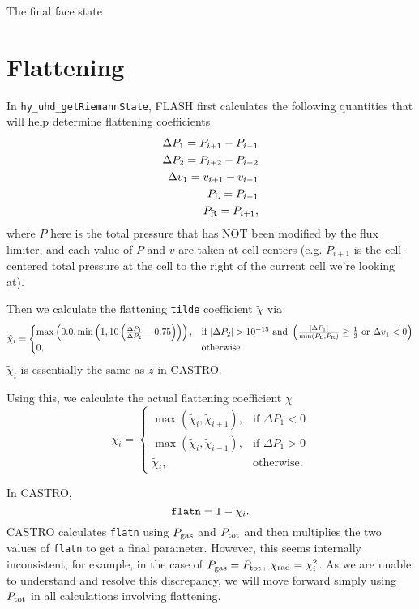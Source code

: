 \documentclass[preprint,11pt]{aastex}
\newcommand{\beq}{\begin{equation}}
\newcommand{\eeq}{\end{equation}}
\newcommand{\bea}{\begin{eqnarray}}
\newcommand{\eea}{\end{eqnarray}}
\begin{document}
The final face state 

\section{Flattening}
\label{sec:flattening}
In \verb!hy_uhd_getRiemannState!, FLASH first calculates the following quantities that will help determine flattening coefficients
\bea
\Delta P_1 = P_{i+1} - P_{i-1} \\
\Delta P_2 = P_{i+2} - P_{i-2} \\
\Delta v_1 = v_{i+1} - v_{i-1} \\
P_{\rm L}  = P_{i-1} \\
P_{\rm R}  = P_{i+1},
\eea
where $P$ here is the total pressure that has NOT been modified by the flux limiter, and each value of $P$ and $v$ are taken at cell centers (e.g. $P_{i+1}$ is the cell-centered total pressure at the cell to the right of the current cell we're looking at).

Then we calculate the flattening \verb!tilde! coefficient $\tilde{\chi}$ via
\[
    \tilde{\chi}_i = 
\begin{cases}
		\max\left(0.0,\min\left(1,10 \left(\frac{\Delta P_1}{\Delta P_2} - 0.75\right)\right)\right),& \text{if } |\Delta P_2| > 10^{-15} \text{ and }\left(\frac{|\Delta P_1|}{\min(P_{\rm L}, P_{\rm R})} \geq \frac{1}{3}\text{ or }\Delta v_1 < 0\right)\\
    0,              & \text{otherwise}.
\end{cases}
\]
$\tilde{\chi}_i$ is essentially the same as $z$ in CASTRO.

Using this, we calculate the actual flattening coefficient $\chi$
\[
    \chi_i = 
\begin{cases}
		\max \left( \tilde{\chi}_i,\tilde{\chi}_{i+1} \right),& \text{if } \Delta P_1 < 0 \\
		\max \left( \tilde{\chi}_i,\tilde{\chi}_{i-1} \right),& \text{if } \Delta P_1 > 0 \\
    \tilde{\chi}_i,              & \text{otherwise}.
\end{cases}
\]

In CASTRO,
\beq
\verb!flatn! = 1 - \chi_i.
\eeq
CASTRO calculates \verb!flatn! using $P_{\rm gas}$ and $P_{\rm tot}$ and then multiplies the two values of \verb!flatn! to get a final parameter.  However, this seems internally inconsistent; for example, in the case of $P_{\rm gas}=P_{\rm tot}$, $\chi_{\rm rad} = \chi_i^2$.  {\color{blue}As we are unable to understand and resolve this discrepancy, we will move forward simply using $P_{\rm tot}$ in all calculations involving flattening.}
\end{document}
